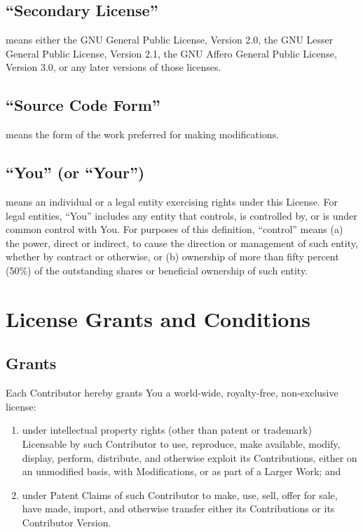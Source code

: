\documentclass[a4paper, 12pt]{article}
\begin{document}
\subsection{``Secondary License''}
means either the GNU General Public License, Version 2.0, the GNU Lesser General Public License, Version 2.1, the GNU Affero General Public License, Version 3.0, or any later versions of those licenses.

\subsection{``Source Code Form''}
means the form of the work preferred for making modifications.

\subsection{``You'' (or ``Your'')}
means an individual or a legal entity exercising rights under this License. For legal entities, ``You'' includes any entity that controls, is controlled by, or is under common control with You. For purposes of this definition, ``control'' means (a) the power, direct or indirect, to cause the direction or management of such entity, whether by contract or otherwise, or (b) ownership of more than fifty percent (50\%) of the outstanding shares or beneficial ownership of such entity.

\section{License Grants and Conditions}

\subsection{Grants}

Each Contributor hereby grants You a world-wide, royalty-free, non-exclusive license:

\begin{enumerate}[label=(\alph*)]
\item under intellectual property rights (other than patent or trademark) Licensable by such Contributor to use, reproduce, make available, modify, display, perform, distribute, and otherwise exploit its Contributions, either on an unmodified basis, with Modifications, or as part of a Larger Work; and
\item under Patent Claims of such Contributor to make, use, sell, offer for sale, have made, import, and otherwise transfer either its Contributions or its Contributor Version.
\end{enumerate}
\end{document}
